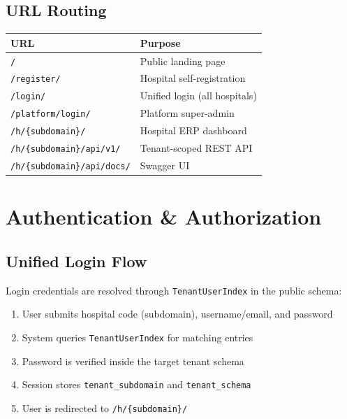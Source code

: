 \documentclass[11pt,a4paper]{report}
\begin{document}
\section{URL Routing}

\begin{table}[h]
\centering
\small
\begin{tabular}{@{}ll@{}}
\toprule
\textbf{URL} & \textbf{Purpose} \\
\midrule
\texttt{/} & Public landing page \\
\texttt{/register/} & Hospital self-registration \\
\texttt{/login/} & Unified login (all hospitals) \\
\texttt{/platform/login/} & Platform super-admin \\
\texttt{/h/\{subdomain\}/} & Hospital ERP dashboard \\
\texttt{/h/\{subdomain\}/api/v1/} & Tenant-scoped REST API \\
\texttt{/h/\{subdomain\}/api/docs/} & Swagger UI \\
\bottomrule
\end{tabular}
\end{table}

\chapter{Authentication \& Authorization}

\section{Unified Login Flow}

Login credentials are resolved through \texttt{TenantUserIndex} in the public schema:

\begin{enumerate}[noitemsep]
    \item User submits hospital code (subdomain), username/email, and password
    \item System queries \texttt{TenantUserIndex} for matching entries
    \item Password is verified inside the target tenant schema
    \item Session stores \texttt{tenant\_subdomain} and \texttt{tenant\_schema}
    \item User is redirected to \texttt{/h/\{subdomain\}/}
\end{enumerate}
\end{document}
